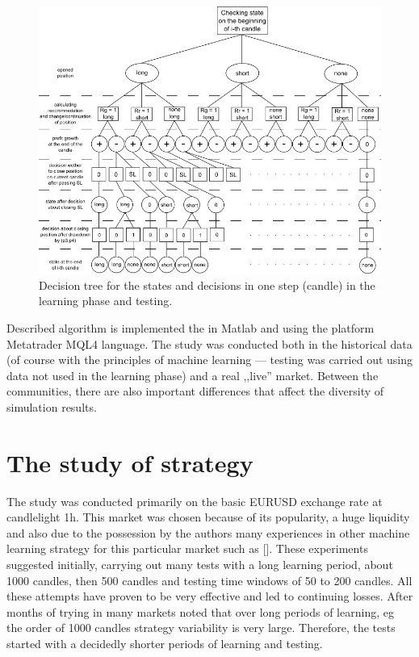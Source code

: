 \documentclass[runningheads,a4paper]{llncs}
\begin{document}
\begin{figure}[h!]
\centering
\includegraphics[width = \textwidth]{figures/rys7.png}
\caption{Decision tree for the states and decisions in one step (candle) in the learning phase and testing.}
\label{fig:fig7}
\end{figure}
\FloatBarrier

Described algorithm is implemented the in Matlab and using the platform Metatrader MQL4 language. The study was conducted both in the historical data (of course with the principles of machine learning --- testing was carried out using data not used in the learning phase) and a real ,,live'' market. Between the communities, there are also important differences that affect the diversity of simulation results.

\section{The study of strategy}
The study was conducted primarily on the basic EURUSD exchange rate at candlelight 1h. This market was chosen because of its popularity, a huge liquidity and also due to the possession by the authors many experiences in other machine learning strategy for this particular market such as []. These experiments suggested initially, carrying out many tests with a long learning period, about 1000 candles, then 500 candles and testing time windows of 50 to 200 candles. All these attempts have proven to be very effective and led to continuing losses. After months of trying in many markets noted that over long periods of learning, eg the order of 1000 candles strategy variability is very large. Therefore, the tests started with a decidedly shorter periods of learning and testing.\\
\end{document}
